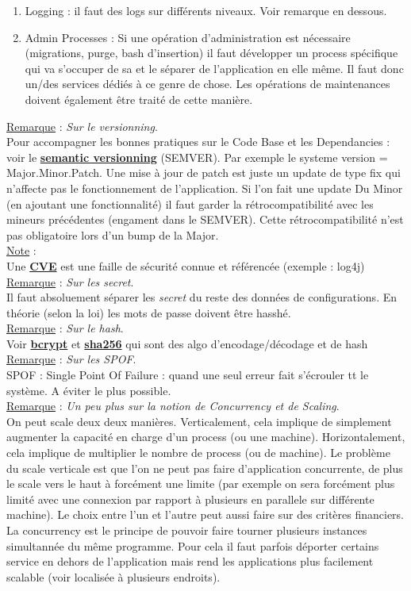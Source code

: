 \documentclass[a4paper,12pt,twoside]{article}
\newcommand{\urlcolor}{magenta}  %
\newcommand{\keycolor}{purple} %
\newcommand{\rem}[2]{\noindent\underline{Remarque} : \textit{#1}.\\ \indent #2}
\newcommand{\note}[1]{\noindent\underline{Note} : \\ \indent #1}
\newcommand{\keyref}[2]{\hypersetup{urlcolor=\keycolor} \href{#1}{\textbf{#2}}\hypersetup{urlcolor=\urlcolor}}
\begin{document}
{\begin{enumerate}
\item Logging : il faut des logs sur différents niveaux. Voir remarque en dessous.
\item Admin Processes : Si une opération d'administration est nécessaire (migrations, purge, bash d'insertion) il faut développer un process spécifique qui va s'occuper de sa et le séparer de l'application en elle même. Il faut donc un/des services dédiés à ce genre de chose. Les opérations de maintenances doivent également être traité de cette manière.\\
\end{enumerate}
}

\rem{Sur le versionning}{Pour accompagner les bonnes pratiques sur le Code Base et les Dependancies : voir le \keyref{https://semver.org/lang/fr/}{semantic versionning} (SEMVER). Par exemple le systeme version =  Major.Minor.Patch. Une mise à jour de patch est juste un update de type fix qui n'affecte pas le fonctionnement de l'application. Si l'on fait une update Du Minor (en ajoutant une fonctionnalité) il faut garder la rétrocompatibilité avec les mineurs précédentes (engament dans le SEMVER). Cette rétrocompatibilité n'est pas obligatoire lors d'un bump de la Major.}\\

\note{Une \keyref{https://cve.mitre.org/}{CVE} est une faille de sécurité connue et référencée (exemple : log4j)}\\

\rem{Sur les secret}{Il faut absoluement séparer les \textit{secret} du reste des données de configurations. En théorie (selon la loi) les mots de passe doivent être hasshé.}\\

\rem{Sur le hash}{Voir \keyref{https://www.bcrypt.fr/}{bcrypt} et \keyref{https://fr.wikipedia.org/wiki/SHA-2}{sha256} qui sont des algo d'encodage/décodage et de hash}\\

\rem{Sur les SPOF}{SPOF : Single Point Of Failure : quand une seul erreur fait s'écrouler tt le système. A éviter le plus possible.}\\

\rem{Un peu plus sur la notion de Concurrency et de Scaling}{On peut scale deux deux manières. Verticalement, cela implique de simplement augmenter la capacité en charge d'un process (ou une machine). Horizontalement, cela implique de multiplier le nombre de process (ou de machine). Le problème du scale verticale est que l'on ne peut pas faire d'application concurrente, de plus le scale vers le haut à forcément une limite (par exemple on sera forcément plus limité avec une connexion par rapport à plusieurs en parallele sur différente machine). Le choix entre l'un et l'autre peut aussi faire sur des critères financiers. La concurrency est le principe de pouvoir faire tourner plusieurs instances simultannée du même programme. Pour cela il faut parfois déporter certains service en dehors de l'application mais rend les applications plus facilement scalable (voir localisée à plusieurs endroits).}\\
\end{document}
